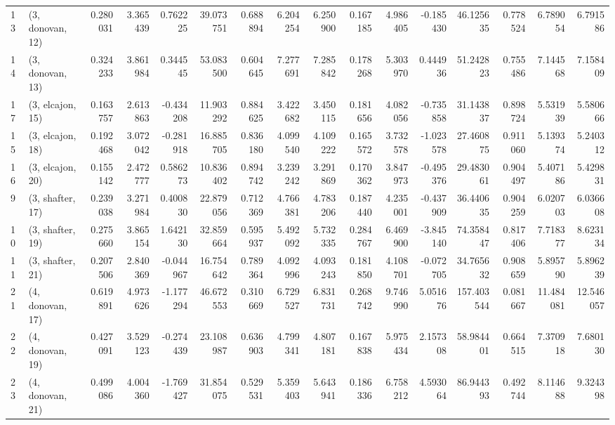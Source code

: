\begin{tabular}{llrrrrrrrrrrrrrr}
13 &  (3, donovan, 12) &   0.280031 &  3.365439 &  0.762225 &  39.073751 &  0.688894 &   6.204254 &  6.250900 &  0.167185 &  4.986405 & -0.185430 &   46.125635 &  0.778524 &   6.789054 &   6.791586 \\
14 &  (3, donovan, 13) &   0.324233 &  3.861984 &  0.344545 &  53.083500 &  0.604645 &   7.277691 &  7.285842 &  0.178268 &  5.303970 &  0.444936 &   51.242823 &  0.755486 &   7.144568 &   7.158409 \\
17 &  (3, elcajon, 15) &   0.163757 &  2.613863 & -0.434208 &  11.903292 &  0.884625 &   3.422682 &  3.450115 &  0.181656 &  4.082056 & -0.735858 &   31.143837 &  0.898724 &   5.531939 &   5.580666 \\
15 &  (3, elcajon, 18) &   0.192468 &  3.072042 & -0.281918 &  16.885705 &  0.836180 &   4.099540 &  4.109222 &  0.165572 &  3.732578 & -1.023578 &   27.460875 &  0.911060 &   5.139374 &   5.240312 \\
16 &  (3, elcajon, 20) &   0.155142 &  2.472777 &  0.586273 &  10.836402 &  0.894742 &   3.239242 &  3.291869 &  0.170362 &  3.847973 & -0.495376 &   29.483061 &  0.904497 &   5.407186 &   5.429831 \\
9  &  (3, shafter, 17) &   0.239038 &  3.271984 &  0.400830 &  22.879056 &  0.712369 &   4.766381 &  4.783206 &  0.187440 &  4.235001 & -0.437909 &   36.440635 &  0.904259 &   6.020703 &   6.036608 \\
10 &  (3, shafter, 19) &   0.275660 &  3.865154 &  1.642130 &  32.859664 &  0.595937 &   5.492092 &  5.732335 &  0.284767 &  6.469900 & -3.845140 &   74.358447 &  0.817406 &   7.718377 &   8.623134 \\
11 &  (3, shafter, 21) &   0.207506 &  2.840369 & -0.044967 &  16.754642 &  0.789364 &   4.092996 &  4.093243 &  0.181850 &  4.108701 & -0.072705 &   34.765632 &  0.908659 &   5.895790 &   5.896239 \\
21 &  (4, donovan, 17) &   0.619891 &  4.973626 & -1.177294 &  46.672553 &  0.310669 &   6.729527 &  6.831731 &  0.268742 &  9.746990 &  5.051676 &  157.403544 &  0.081667 &  11.484081 &  12.546057 \\
22 &  (4, donovan, 19) &   0.427091 &  3.529123 & -0.274439 &  23.108987 &  0.636903 &   4.799341 &  4.807181 &  0.167838 &  5.975434 &  2.157308 &   58.984401 &  0.664515 &   7.370918 &   7.680130 \\
23 &  (4, donovan, 21) &   0.499086 &  4.004360 & -1.769427 &  31.854075 &  0.529531 &   5.359403 &  5.643941 &  0.186336 &  6.758212 &  4.593064 &   86.944393 &  0.492744 &   8.114688 &   9.324398 \\

\end{tabular}
